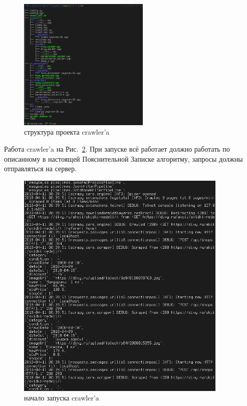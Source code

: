 \begin{figure}[h!]
    \centering
    \includegraphics[width=0.56\textwidth]{./screenshots/3/tree.png}
    \caption{\small{структура проекта crawler'a}}
    \label{tree}
\end{figure}

\newpage
Работа crawler'a на Рис.~\ref{crawl_dixy}. При запуске всё работает должно
работать по описанному в настоящей Пояснительной Записке алгоритму, запросы
должны отправляться на сервер.

\begin{figure}[h!]
    \centering
    \includegraphics[width=0.9\textwidth]{./screenshots/3/crawl_dixy.png}
    \caption{\small{начало запуска crawler'a}}
    \label{crawl_dixy}
\end{figure}


